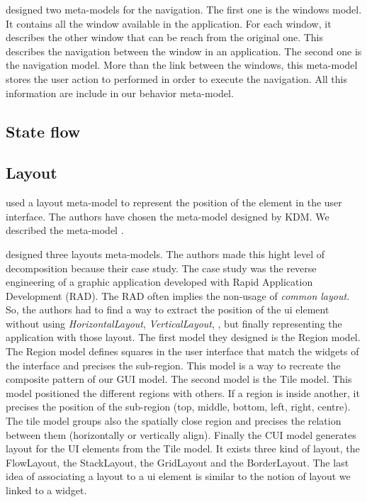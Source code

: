 \documentclass[conference]{IEEEtran}
\begin{document}
\citet{morgado2011reverse} designed two meta-models for the navigation.
The first one is the windows model.
It contains all the window available in the application.
For each window, it describes the other window that can be reach from the original one.
This describes the navigation between the window in an application.
The second one is the navigation model.
More than the link between the windows,
    this meta-model stores the user action to performed in order to execute the navigation.
All this information are include in our behavior meta-model.

\subsection{State flow}
\label{sec:state}

\subsection{Layout}
\label{sec:layout}

\citet{gotti2016java} used a layout meta-model to represent
    the position of the element in the user interface.
The authors have chosen the meta-model designed by KDM.
We described the meta-model .

\citet{sanchez2014model} designed three layouts meta-models.
The authors made this hight level of decomposition because their case study.
The case study was the reverse engineering of a graphic application developed
    with Rapid Application Development (RAD).
The RAD often implies the non-usage of \textit{common layout}.
So, the authors had to find a way to extract the position of the ui element
    without using \textit{HorizontalLayout}, \textit{VerticalLayout}, \etc, but
    finally representing the application with those layout.
The first model they designed is the Region model.
The Region model defines squares in the user interface that match the widgets of the interface
    and precises the sub-region.
This model is a way to recreate the composite pattern of our GUI model.
The second model is the Tile model.
This model positioned the different regions with others.
If a region is inside another, it precises the position of the sub-region (top, middle, bottom, left, right, centre).
The tile model groups also the spatially close region and precises the relation between them (horizontally or vertically align).
Finally the CUI model generates layout for the UI elements from the Tile model.
It exists three kind of layout, the FlowLayout, the StackLayout, the GridLayout and the BorderLayout.
The last idea of associating a layout to a ui element is similar to the notion of layout we linked to a widget.
\end{document}
